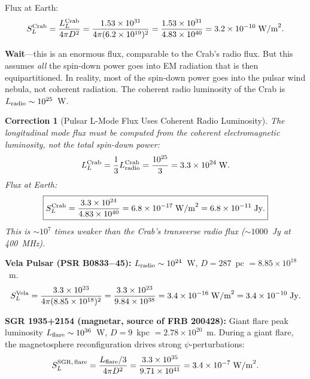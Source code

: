 \documentclass[11pt]{article}
\newtheorem{correction}{Correction}
\newcommand{\ee}[1]{\times 10^{#1}}
\begin{document}
Flux at Earth:
\begin{equation}
S_L^{\rm Crab} = \frac{L_L^{\rm Crab}}{4\pi D^2}
= \frac{1.53\ee{31}}{4\pi (6.2\ee{19})^2}
= \frac{1.53\ee{31}}{4.83\ee{40}} = 3.2\ee{-10}\;\text{W/m}^2.
\label{eq:flux-crab}
\end{equation}

\textbf{Wait}---this is an enormous flux, comparable to the Crab's
radio flux. But this assumes \textit{all} the spin-down power goes
into EM radiation that is then equipartitioned. In reality, most of
the spin-down power goes into the pulsar wind nebula, not coherent
radiation. The coherent radio luminosity of the Crab is
$L_{\rm radio} \sim 10^{25}$~W.

\begin{correction}[Pulsar L-Mode Flux Uses Coherent Radio Luminosity]
\label{corr:pulsar-flux}
The longitudinal mode flux must be computed from the \textit{coherent
electromagnetic luminosity}, not the total spin-down power:
\begin{equation}
L_L^{\rm Crab} = \frac{1}{3} L_{\rm radio}^{\rm Crab}
= \frac{10^{25}}{3} = 3.3\ee{24}\;\text{W}.
\end{equation}
Flux at Earth:
\begin{equation}
\boxed{S_L^{\rm Crab} = \frac{3.3\ee{24}}{4.83\ee{40}}
= 6.8\ee{-17}\;\text{W/m}^2 = 6.8\ee{-11}\;\text{Jy}.}
\end{equation}
This is $\sim 10^7$ times weaker than the Crab's transverse radio
flux ($\sim 1000$~Jy at 400~MHz).
\end{correction}

\textbf{Vela Pulsar (PSR B0833$-$45):}
$L_{\rm radio} \sim 10^{24}$~W, $D = 287$~pc $= 8.85\ee{18}$~m.
\begin{equation}
S_L^{\rm Vela} = \frac{3.3\ee{23}}{4\pi (8.85\ee{18})^2}
= \frac{3.3\ee{23}}{9.84\ee{38}} = 3.4\ee{-16}\;\text{W/m}^2
= 3.4\ee{-10}\;\text{Jy}.
\end{equation}

\textbf{SGR 1935+2154 (magnetar, source of FRB 200428):}
Giant flare peak luminosity $L_{\rm flare} \sim 10^{36}$~W,
$D = 9$~kpc $= 2.78\ee{20}$~m. During a giant flare, the
magnetosphere reconfiguration drives strong $\psi$-perturbations:
\begin{equation}
S_L^{\rm SGR,\,flare} = \frac{L_{\rm flare}/3}{4\pi D^2}
= \frac{3.3\ee{35}}{9.71\ee{41}} = 3.4\ee{-7}\;\text{W/m}^2.
\end{equation}
\end{document}
